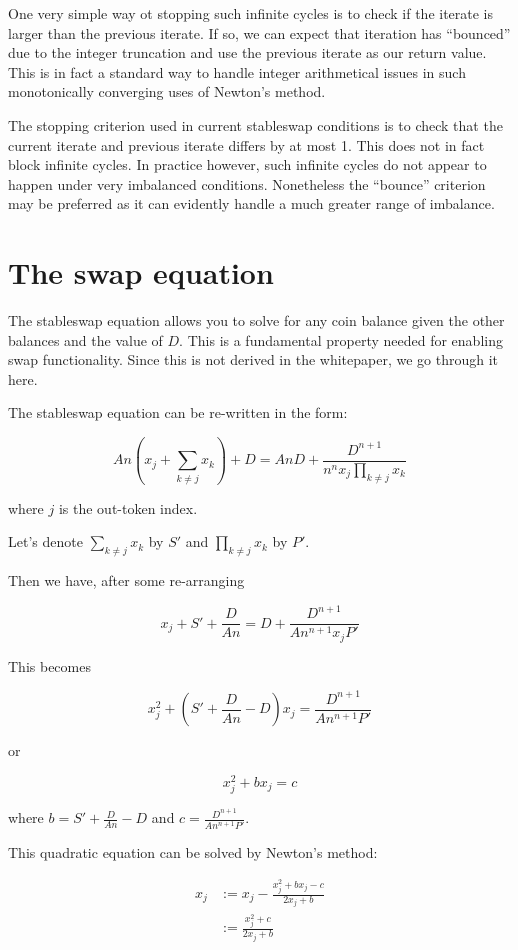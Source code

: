 \documentclass[
]{article}
\begin{document}
One very simple way ot stopping such infinite cycles is to check if the
iterate is larger than the previous iterate. If so, we can expect that
iteration has ``bounced'' due to the integer truncation and use the
previous iterate as our return value. This is in fact a standard way to
handle integer arithmetical issues in such monotonically converging uses
of Newton's method.

The stopping criterion used in current stableswap conditions is to check
that the current iterate and previous iterate differs by at most 1. This
does not in fact block infinite cycles. In practice however, such
infinite cycles do not appear to happen under very imbalanced
conditions. Nonetheless the ``bounce'' criterion may be preferred as it
can evidently handle a much greater range of imbalance.

\hypertarget{the-swap-equation}{%
\section{The swap equation}\label{the-swap-equation}}

The stableswap equation allows you to solve for any coin balance given
the other balances and the value of \(D\). This is a fundamental
property needed for enabling swap functionality. Since this is not
derived in the whitepaper, we go through it here.

The stableswap equation can be re-written in the form:

\[ An\left(x_j + \sum_{k\neq j} x_k\right) + D = AnD + \frac{D^{n+1}}{n^n x_j \prod_{k\neq j} x_k} \]

where \(j\) is the out-token index.

Let's denote \(\sum_{k\neq j} x_k\) by \(S'\) and
\(\prod_{k\neq j} x_k\) by \(P'\).

Then we have, after some re-arranging

\[ x_j + S' + \frac{D}{An} = D + \frac{D^{n+1}}{An^{n+1} x_j P'} \]

This becomes

\[ x_j^2 + \left(S' + \frac{D}{An} - D\right) x_j = \frac{D^{n+1}}{An^{n+1}P'}\]

or

\[ x_j^2 + bx_j = c\]

where \(b = S' + \frac{D}{An} - D\) and
\(c = \frac{D^{n+1}}{An^{n+1}P'}\).

This quadratic equation can be solved by Newton's method:

\[ \begin{aligned}
x_j &:= x_j - \frac{x_j^2 + bx_j - c}{2x_j + b}\\
&:= \frac{x_j^2 + c}{2x_j + b} \\
\end{aligned} \]
\end{document}
